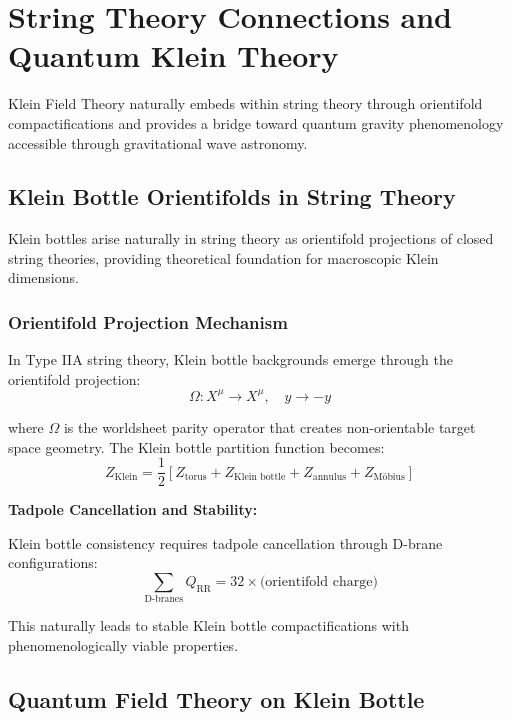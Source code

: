 \documentclass[12pt]{iopart}
\begin{document}
\section{String Theory Connections and Quantum Klein Theory}

Klein Field Theory naturally embeds within string theory through orientifold compactifications and provides a bridge toward quantum gravity phenomenology accessible through gravitational wave astronomy.

\subsection{Klein Bottle Orientifolds in String Theory}

Klein bottles arise naturally in string theory as orientifold projections of closed string theories, providing theoretical foundation for macroscopic Klein dimensions.

\subsubsection{Orientifold Projection Mechanism}

In Type IIA string theory, Klein bottle backgrounds emerge through the orientifold projection:
\begin{equation}
\Omega: X^\mu \to X^\mu, \quad y \to -y
\label{eq:orientifold_projection}
\end{equation}

where $\Omega$ is the worldsheet parity operator that creates non-orientable target space geometry. The Klein bottle partition function becomes:
\begin{equation}
Z_{\text{Klein}} = \frac{1}{2}\left[Z_{\text{torus}} + Z_{\text{Klein bottle}} + Z_{\text{annulus}} + Z_{\text{Möbius}}\right]
\label{eq:klein_partition_function}
\end{equation}

\textbf{Tadpole Cancellation and Stability:}

Klein bottle consistency requires tadpole cancellation through D-brane configurations:
\begin{equation}
\sum_{\text{D-branes}} Q_{\text{RR}} = 32 \times \text{(orientifold charge)}
\label{eq:tadpole_cancellation}
\end{equation}

This naturally leads to stable Klein bottle compactifications with phenomenologically viable properties.

\subsection{Quantum Field Theory on Klein Bottle}
\end{document}
